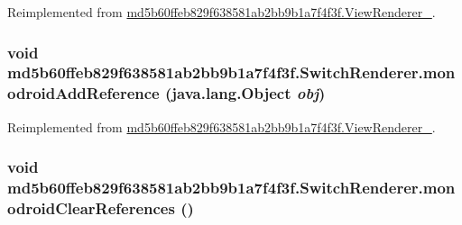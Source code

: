 Reimplemented from \hyperlink{classmd5b60ffeb829f638581ab2bb9b1a7f4f3f_1_1_view_renderer__2_a0898cf56fa9a49b653470eaf1608e77}{md5b60ffeb829f638581ab2bb9b1a7f4f3f.ViewRenderer\_}.\hypertarget{classmd5b60ffeb829f638581ab2bb9b1a7f4f3f_1_1_switch_renderer_028e2f4c76a4c1f2172e7e22c873f457}{
\subsubsection[{monodroidAddReference}]{\setlength{\rightskip}{0pt plus 5cm}void md5b60ffeb829f638581ab2bb9b1a7f4f3f.SwitchRenderer.monodroidAddReference (java.lang.Object {\em obj})}}
\label{classmd5b60ffeb829f638581ab2bb9b1a7f4f3f_1_1_switch_renderer_028e2f4c76a4c1f2172e7e22c873f457}




Reimplemented from \hyperlink{classmd5b60ffeb829f638581ab2bb9b1a7f4f3f_1_1_view_renderer__2_64ca8244a89f60a47c173d9c0b15d610}{md5b60ffeb829f638581ab2bb9b1a7f4f3f.ViewRenderer\_}.\hypertarget{classmd5b60ffeb829f638581ab2bb9b1a7f4f3f_1_1_switch_renderer_88c5734750b36ec1ff059a1db489262c}{
\subsubsection[{monodroidClearReferences}]{\setlength{\rightskip}{0pt plus 5cm}void md5b60ffeb829f638581ab2bb9b1a7f4f3f.SwitchRenderer.monodroidClearReferences ()}}
\label{classmd5b60ffeb829f638581ab2bb9b1a7f4f3f_1_1_switch_renderer_88c5734750b36ec1ff059a1db489262c}




